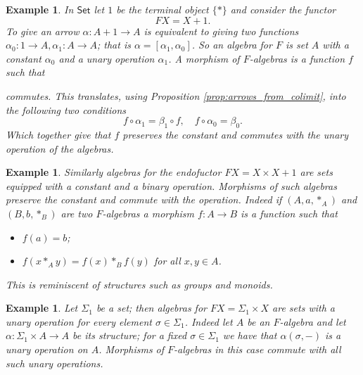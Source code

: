 \documentclass[letterpaper, 11pt, oneside]{memoir}
\theoremstyle{myteo}
\newtheorem{example}[theorem]{Example}
\numberwithin{equation}{section}
\newcommand{\id}{\textsf{id}}
\newcommand{\Set}{\textsf{Set}}
\newcommand{\outofcoprod}[2]{{[#1, #2]}}
\begin{document}
\begin{example}
  \label{ex:prepoly1}
  In \(\Set\) let \(1\) be the terminal object \(\{*\}\) and consider the functor
  \begin{equation*}
    FX = X + 1.
  \end{equation*}
  To give an arrow \(\alpha \colon A + 1 \to A\) is equivalent to giving two functions \(\alpha_0 \colon 1 \to A, \alpha_1 \colon A \to A\); that is \(\alpha = [\alpha_1, \alpha_0]\).
  So an algebra for \(F\) is set \(A\) with a constant \(\alpha_0\) and a unary operation \(\alpha_1\).
  A morphism of \(F\)-algebras is a function \(f\) such that
  \begin{center}
  \end{center}
  commutes.
  This translates, using Proposition \ref{prop:arrows_from_colimit}, into the following two conditions
  \[f \circ \alpha_1 = \beta_1 \circ f, \quad f \circ \alpha_0 = \beta_0.\]
  Which together give that \(f\) preserves the constant and commutes with the unary operation of the algebras.
\end{example}

\begin{example}
  \label{ex:prepoly2}
  Similarly algebras for the endofuctor \(FX = X \times X + 1\) are sets equipped with a constant and a binary operation.
  Morphisms of such algebras preserve the constant and commute with the operation.
  Indeed if \((A, a, \ast_A)\) and \((B, b, \ast_B)\) are two \(F\)-algebras a morphism \(f \colon A \to B\) is a function such that
  \begin{itemize}
  \item[1.] \(f(a) = b\);
  \item[2.] \(f(x \ast_A y) = f(x) \ast_B f(y)\) for all \(x, y \in A\).
  \end{itemize}
  This is reminiscent of structures such as groups and monoids.
\end{example}

\begin{example}
  \label{ex:prepoly3}
  Let \(\Sigma_1\) be a set; then algebras for \(FX = \Sigma_1 \times X\) are sets with a unary operation for every element \(\sigma \in \Sigma_1\).
  Indeed let \(A\) be an \(F\)-algebra and let \(\alpha \colon \Sigma_1 \times A \to A\) be its structure; for a fixed \(\sigma \in \Sigma_1\) we have that \(\alpha(\sigma, -)\) is a unary operation on \(A\).
  Morphisms of \(F\)-algebras in this case commute with all such unary operations.
\end{example}
\end{document}
